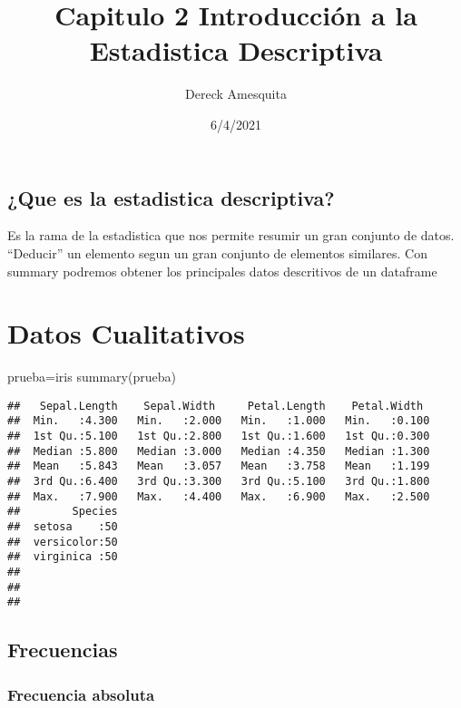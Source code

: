 \documentclass[
]{article}
\title{Capitulo 2 Introducción a la Estadistica Descriptiva}
\author{Dereck Amesquita}
\date{6/4/2021}
\newenvironment{Shaded}{\begin{snugshade}}{\end{snugshade}}
\newcommand{\FunctionTok}[1]{\textcolor[rgb]{0.00,0.00,0.00}{#1}}
\newcommand{\NormalTok}[1]{#1}
\newcommand{\OtherTok}[1]{\textcolor[rgb]{0.56,0.35,0.01}{#1}}
\begin{document}
\maketitle

\hypertarget{que-es-la-estadistica-descriptiva}{%
\subsection{¿Que es la estadistica
descriptiva?}\label{que-es-la-estadistica-descriptiva}}

Es la rama de la estadistica que nos permite resumir un gran conjunto de
datos. ``Deducir'' un elemento segun un gran conjunto de elementos
similares. Con summary podremos obtener los principales datos
descritivos de un dataframe

\hypertarget{datos-cualitativos}{%
\section{Datos Cualitativos}\label{datos-cualitativos}}

\begin{Shaded}
\begin{Highlighting}[]
\NormalTok{prueba}\OtherTok{=}\NormalTok{iris}
\FunctionTok{summary}\NormalTok{(prueba)}
\end{Highlighting}
\end{Shaded}

\begin{verbatim}
##   Sepal.Length    Sepal.Width     Petal.Length    Petal.Width   
##  Min.   :4.300   Min.   :2.000   Min.   :1.000   Min.   :0.100  
##  1st Qu.:5.100   1st Qu.:2.800   1st Qu.:1.600   1st Qu.:0.300  
##  Median :5.800   Median :3.000   Median :4.350   Median :1.300  
##  Mean   :5.843   Mean   :3.057   Mean   :3.758   Mean   :1.199  
##  3rd Qu.:6.400   3rd Qu.:3.300   3rd Qu.:5.100   3rd Qu.:1.800  
##  Max.   :7.900   Max.   :4.400   Max.   :6.900   Max.   :2.500  
##        Species  
##  setosa    :50  
##  versicolor:50  
##  virginica :50  
##                 
##                 
## 
\end{verbatim}

\hypertarget{frecuencias}{%
\subsection{Frecuencias}\label{frecuencias}}

\hypertarget{frecuencia-absoluta}{%
\subsubsection{Frecuencia absoluta}\label{frecuencia-absoluta}}
\end{document}
